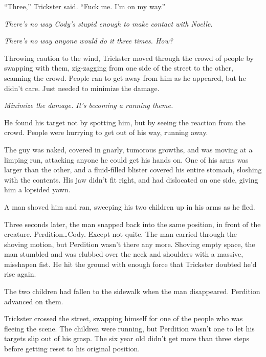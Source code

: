 ``Three,'' Trickster said.  ``Fuck me.  I'm on my way.''



\blacksquare



\emph{There's no way Cody's stupid enough to make contact with Noelle}.



\emph{There's no way anyone would do it three times.  How?}



Throwing caution to the wind, Trickster moved through the crowd of people by swapping with them, zig-zagging from one side of the street to the other, scanning the crowd.  People ran to get away from him as he appeared, but he didn't care.  Just needed to minimize the damage.



\emph{Minimize the damage.  It's becoming a running theme.}



He found his target not by spotting him, but by seeing the reaction from the crowd.  People were hurrying to get out of his way, running away.



The guy was naked, covered in gnarly, tumorous growths, and was moving at a limping run, attacking anyone he could get his hands on.  One of his arms was larger than the other, and a fluid-filled blister covered his entire stomach, sloshing with the contents.  His jaw didn't fit right, and had dislocated on one side, giving him a lopsided yawn.



A man shoved him and ran, sweeping his two children up in his arms as he fled.



Three seconds later, the man snapped back into the same position, in front of the creature.  Perdition\ldots Cody.  Except not quite.  The man carried through the shoving motion, but Perdition wasn't there any more.  Shoving empty space, the man stumbled and was clubbed over the neck and shoulders with a massive, misshapen fist.  He hit the ground with enough force that Trickster doubted he'd rise again.



The two children had fallen to the sidewalk when the man disappeared.  Perdition advanced on them.



Trickster crossed the street, swapping himself for one of the people who was fleeing the scene.  The children were running, but Perdition wasn't one to let his targets slip out of his grasp.  The six year old didn't get more than three steps before getting reset to his original position.



